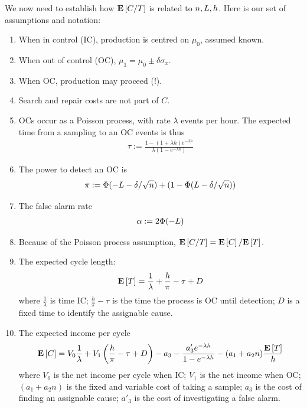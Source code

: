 We now need to establish how $\mathbf{E}\left[ C/T \right]$ is related to $n,L,h$. Here is our set of assumptions and notation:
\begin{enumerate}
\item When in control (IC), production is centred on $\mu_0$, assumed known. 
\item When out of control (OC), $\mu_1=\mu_0 \pm \delta \sigma_x$. 
\item When OC, production may proceed (!). 
\item Search and repair costs are not part of $C$.
\item OCs occur as a Poisson process, with rate $\lambda$ events per hour. The expected time from a sampling to an OC events is thus 
\begin{align}
	\tau := \frac{1-(1+ \lambda h) e^{-\lambda h}}{\lambda(1-e^{-\lambda h})}
\end{align} 
\item The power to detect an OC is 
\begin{align}
	\pi:= \Phi(-L-\delta/\sqrt{n})+ (1-\Phi(L-\delta/\sqrt{n}))
\end{align}
\item The false alarm rate
\begin{align}
	\alpha:= 2 \Phi(-L)
\end{align}
\item Because of the Poisson process assumption,  $\mathbf{E}\left[ C/T \right]=\mathbf{E}\left[ C \right]/\mathbf{E}\left[ T \right]$. 
\item The expected cycle length:
\begin{align}
	\mathbf{E}\left[ T \right]= \frac{1}{\lambda}+ \frac{h}{\pi}- \tau  + D
\end{align}
where $\frac{1}{\lambda}$ is time IC;
$\frac{h}{\pi}- \tau$ is the time the process is OC until detection;
$D$ is a fixed time to identify the assignable cause. 
\item The expected income per cycle
\begin{align*}
	\mathbf{E}\left[ C \right]= V_0 \frac{1}{\lambda} + 
	V_1 \left(\frac{h}{\pi}- \tau  + D  \right) - 
	a_3 -
	\frac{a'_3 e^{-\lambda h}}{1-e^{-\lambda h}} -
	(a_1+a_2n)\frac{\mathbf{E}\left[ T \right]}{h}
\end{align*}
where $V_0$ is the net income per cycle when IC;
$V_1$ is the net income when OC;
$(a_1+a_2n)$ is the fixed and variable cost of taking a sample;
$a_3$ is the cost of finding an assignable cause;
$a'_3$ is the cost of investigating a false alarm.
\end{enumerate}

